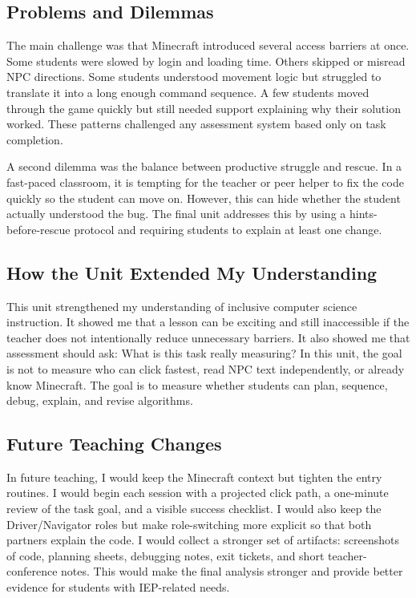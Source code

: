 \documentclass[12pt]{article}
\begin{document}
\subsection{Problems and Dilemmas}
The main challenge was that Minecraft introduced several access barriers at once. Some students were slowed by login and loading time. Others skipped or misread NPC directions. Some students understood movement logic but struggled to translate it into a long enough command sequence. A few students moved through the game quickly but still needed support explaining why their solution worked. These patterns challenged any assessment system based only on task completion.

A second dilemma was the balance between productive struggle and rescue. In a fast-paced classroom, it is tempting for the teacher or peer helper to fix the code quickly so the student can move on. However, this can hide whether the student actually understood the bug. The final unit addresses this by using a hints-before-rescue protocol and requiring students to explain at least one change.

\subsection{How the Unit Extended My Understanding}
This unit strengthened my understanding of inclusive computer science instruction. It showed me that a lesson can be exciting and still inaccessible if the teacher does not intentionally reduce unnecessary barriers. It also showed me that assessment should ask: What is this task really measuring? In this unit, the goal is not to measure who can click fastest, read NPC text independently, or already know Minecraft. The goal is to measure whether students can plan, sequence, debug, explain, and revise algorithms.

\subsection{Future Teaching Changes}
In future teaching, I would keep the Minecraft context but tighten the entry routines. I would begin each session with a projected click path, a one-minute review of the task goal, and a visible success checklist. I would also keep the Driver/Navigator roles but make role-switching more explicit so that both partners explain the code. I would collect a stronger set of artifacts: screenshots of code, planning sheets, debugging notes, exit tickets, and short teacher-conference notes. This would make the final analysis stronger and provide better evidence for students with IEP-related needs.
\end{document}
